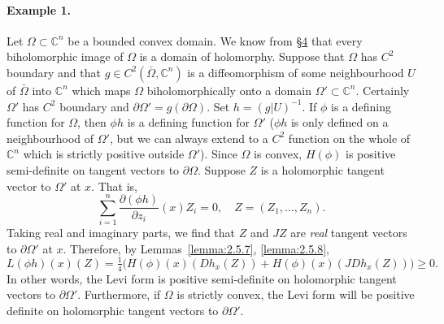 \paragraph*{Example 1.} Let $\Omega\subset\mathbb C^n$ be a bounded convex domain. We know from \hyperref[sec:2:4]{\S4} that every biholomorphic image of $\Omega$ is a domain of holomorphy. Suppose that $\Omega$ has $C^2$ boundary and that $g\in C^2(\bar\Omega,\mathbb C^n)$ is a diffeomorphism of some neighbourhood $U$ of $\bar\Omega$ into $\mathbb C^n$ which maps $\Omega$ biholomorphically onto a domain $\Omega'\subset\mathbb C^n$. Certainly $\Omega'$ has $C^2$ boundary and $\partial\Omega'=g(\partial\Omega)$. Set $h=(g|U)^{-1}$. If $\phi$ is a defining function for $\Omega$, then $\phi h$ is a defining function for $\Omega'$ ($\phi h$ is only defined on a neighbourhood of $\Omega'$, but we can always extend to a $C^2$ function on the whole of $\mathbb C^n$ which is strictly positive outside $\Omega'$). Since $\Omega$ is convex, $H(\phi)$ is positive semi-definite on tangent vectors to $\partial\Omega$. Suppose $Z$ is a holomorphic tangent vector to $\Omega'$ at $x$. That is,
\[\sum_{i=1}^n\frac{\partial(\phi h)}{\partial z_i}(x)Z_i=0,\quad Z=(Z_1,\ldots,Z_n).\]
Taking real and imaginary parts, we find that $Z$ and $JZ$ are \emph{real} tangent vectors to $\partial\Omega'$ at $x$. Therefore, by Lemmas~\ref{lemma:2.5.7}, \ref{lemma:2.5.8},
\[L(\phi h)(x)(Z)=\tfrac14\bigl(H(\phi)(x)(Dh_x(Z))+H(\phi)(x)(JDh_x(Z))\bigr)\geq0.\]
In other words, the Levi form is positive semi-definite on holomorphic tangent vectors to $\partial\Omega'$. Furthermore, if $\Omega$ is strictly convex, the Levi form will be positive definite on holomorphic tangent vectors to $\partial\Omega'$.
